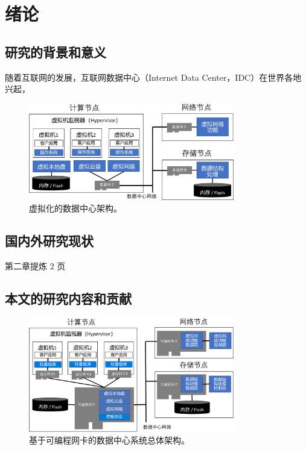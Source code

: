 \chapter{绪论}

\section{研究的背景和意义}

随着互联网的发展，互联网数据中心（Internet Data Center，IDC）在世界各地兴起，


\begin{figure}[htbp]
	\centering
	\includegraphics[width=0.8\textwidth]{figures/virt_arch.pdf}
	\caption{虚拟化的数据中心架构。}
	\label{background:fig:virt-architecture}
\end{figure}

\section{国内外研究现状}




第二章提炼 2 页

\section{本文的研究内容和贡献}



\begin{figure}[htbp]
	\centering
	\includegraphics[width=0.8\textwidth]{figures/accel_arch.pdf}
	\caption{基于可编程网卡的数据中心系统总体架构。}
	\label{arch:fig:accel-arch}
\end{figure}

